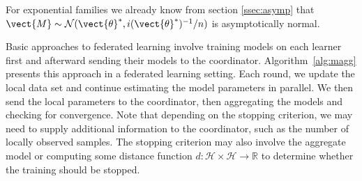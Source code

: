 For exponential families we already know from section \ref{ssec:asymp} that $\vect{M} \sim \mathcal{N}(\vect{\theta}^*, i(\vect{\theta}^*)^{-1}/n)$ is asymptotically normal.

Basic approaches to federated learning involve training models on each learner first and afterward sending their models to the coordinator.
Algorithm~\ref{alg:magg} presents this approach in a federated learning setting. 
Each round, we update the local data set and continue estimating the model parameters in parallel. 
We then send the local parameters to the coordinator, then aggregating the models and checking for convergence.
Note that depending on the stopping criterion, we may need to supply additional information to the coordinator, such as the number of locally observed samples. 
The stopping criterion may also involve the aggregate model or computing some distance function $d: \mathcal{H} \times \mathcal{H}  \rightarrow \mathbb{R}$  to determine whether the training should be stopped.
